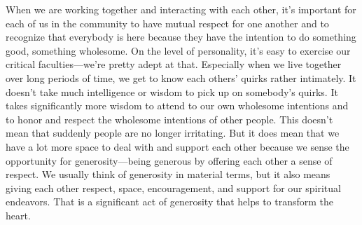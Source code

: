
When we are working together and interacting with each other, it's 
important for each of us in the community to have mutual respect for 
one another and to recognize that everybody is here because they have 
the intention to do something good, something wholesome. On the level 
of personality, it's easy to exercise our critical faculties---we're 
pretty adept at that. Especially when we live together over long 
periods of time, we get to know each others' quirks rather intimately. 
It doesn't take much intelligence or wisdom to pick up on somebody's 
quirks. It takes significantly more wisdom to attend to our own 
wholesome intentions and to honor and respect the wholesome intentions 
of other people. This doesn't mean that suddenly people are no longer 
irritating. But it does mean that we have a lot more space to deal with 
and support each other because we sense the opportunity for 
generosity---being generous by offering each other a sense of respect. 
We usually think of generosity in material terms, but it also means 
giving each other respect, space, encouragement, and support for our 
spiritual endeavors. That is a significant act of generosity that helps 
to transform the heart.

